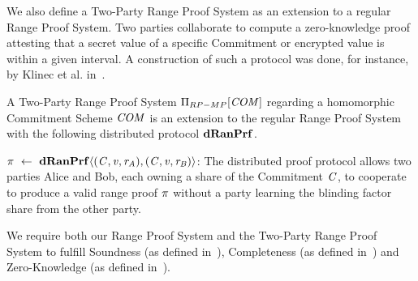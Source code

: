We also define a Two-Party Range Proof System as an extension to a regular Range Proof System.
Two parties collaborate to compute a zero-knowledge proof attesting that a secret value of a specific Commitment or encrypted value is within a given interval.
A construction of such a protocol was done, for instance, by Klinec et al. in~\cite{klinec2020privacy}.

\begin{definition}\label{def:pre:mp-rangeproof}
    A Two-Party Range Proof System $\Pi_{RP-MP}[\mathit{COM}]$ regarding a homomorphic Commitment Scheme $\mathit{COM}$ is an extension to the regular Range Proof System with the following
    distributed protocol $\mathbf{dRanPrf}$.
    \begin{asparaitem}
        \item $\pi ~\leftarrow~ \mathbf{dRanPrf} \langle (\mathit{C},\mathit{v},\mathit{r}_{\mathit{A}}),(\mathit{C},\mathit{v},\mathit{r}_{\mathit{B}}) \rangle$: The distributed proof protocol allows two parties Alice and Bob, each owning a share of the
        Commitment $\mathit{C}$, to cooperate to produce a valid range proof $\pi$ without a party learning the blinding factor share from the other party.
    \end{asparaitem}
\end{definition}

We require both our Range Proof System and the Two-Party Range Proof System to fulfill Soundness (as defined in~\cite{morais2019survey}), Completeness (as defined in~\cite{morais2019survey}) and Zero-Knowledge (as defined in~\cite{fuchsbauer2019aggregate}).
